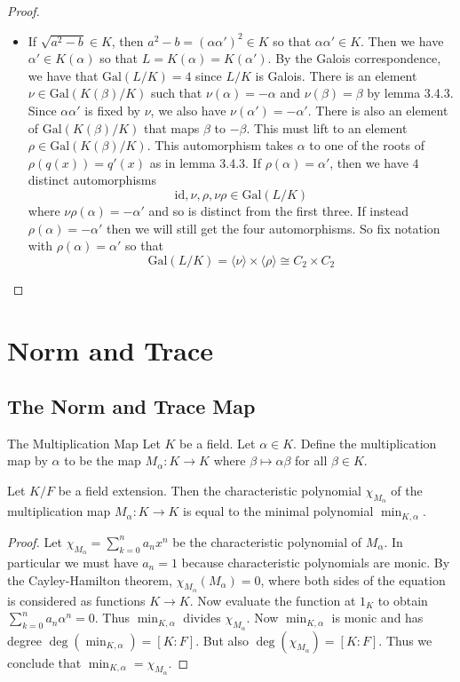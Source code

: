 \documentclass[a4paper]{article}
\begin{document}
\begin{thm}{}{}
\begin{proof}
\begin{itemize}
\item If $\sqrt{a^2-b}\in K$, then $a^2-b=(\alpha\alpha')^2\in K$ so that $\alpha\alpha'\in K$. Then we have $\alpha'\in K(\alpha)$ so that $L=K(\alpha)=K(\alpha')$. By the Galois correspondence, we have that $\text{Gal}(L/K)=4$ since $L/K$ is Galois. There is an element $\nu\in\text{Gal}(K(\beta)/K)$ such that $\nu(\alpha)=-\alpha$ and $\nu(\beta)=\beta$ by lemma 3.4.3. Since $\alpha\alpha'$ is fixed by $\nu$, we also have $\nu(\alpha')=-\alpha'$. There is also an element of $\text{Gal}(K(\beta)/K)$ that maps $\beta$ to $-\beta$. This must lift to an element $\rho\in\text{Gal}(K(\beta)/K)$. This automorphism takes $\alpha$ to one of the roots of $\rho(q(x))=q'(x)$ as in lemma 3.4.3.  If $\rho(\alpha)=\alpha'$, then we have $4$ distinct automorphisms $$\text{id},\nu,\rho,\nu\rho\in\text{Gal}(L/K)$$ where $\nu\rho(\alpha)=-\alpha'$ and so is distinct from the first three. If instead $\rho(\alpha)=-\alpha'$ then we will still get the four automorphisms. So fix notation with $\rho(\alpha)=\alpha'$ so that $$\text{Gal}(L/K)=\langle\nu\rangle\times\langle\rho\rangle\cong C_2\times C_2$$
\end{itemize}
\end{proof}
\end{thm}

\pagebreak
\section{Norm and Trace}
\subsection{The Norm and Trace Map}
\begin{defn}{The Multiplication Map}{} Let $K$ be a field. Let $\alpha\in K$. Define the multiplication map by $\alpha$ to be the map $M_\alpha:K\to K$ where $\beta\mapsto\alpha\beta$ for all $\beta\in K$. 
\end{defn}

\begin{prp}{}{} Let $K/F$ be a field extension. Then the characteristic polynomial $\chi_{M_\alpha}$ of the multiplication map $M_\alpha:K\to K$ is equal to the minimal polynomial $\min_{K,\alpha}$. 
\begin{proof}
Let $\chi_{M_\alpha}=\sum_{k=0}^na_nx^n$ be the characteristic polynomial of $M_\alpha$. In particular we must have $a_n=1$ because characteristic polynomials are monic. By the Cayley-Hamilton theorem, $\chi_{M_\alpha}(M_\alpha)=0$, where both sides of the equation is considered as functions $K\to K$. Now evaluate the function at $1_K$ to obtain $\sum_{k=0}^na_n\alpha^n=0$. Thus $\min_{K,\alpha}$ divides $\chi_{M_\alpha}$. Now $\min_{K,\alpha}$ is monic and has degree $\deg(\min_{K,\alpha})=[K:F]$. But also $\deg(\chi_{M_\alpha})=[K:F]$. Thus we conclude that $\min_{K,\alpha}=\chi_{M_\alpha}$. 
\end{proof}
\end{prp}
\end{document}
